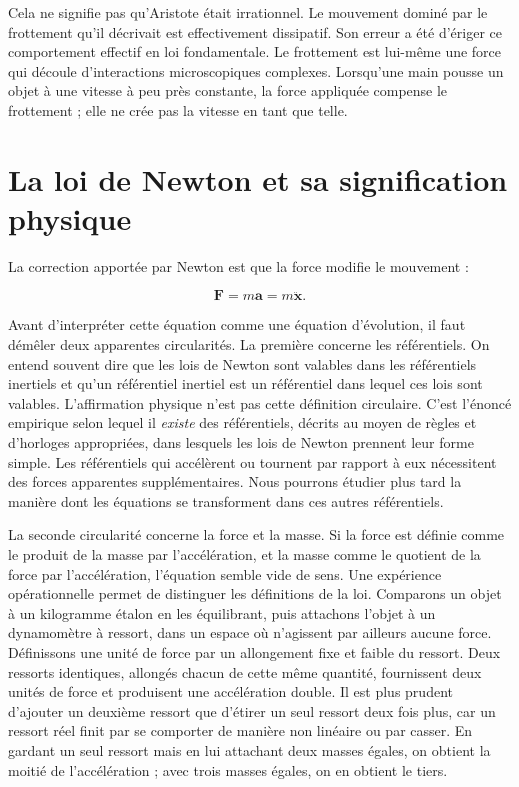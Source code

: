 Cela ne signifie pas qu’Aristote était irrationnel. Le mouvement dominé par le frottement qu’il décrivait est effectivement dissipatif. Son erreur a été d’ériger ce comportement effectif en loi fondamentale. Le frottement est lui-même une force qui découle d’interactions microscopiques complexes. Lorsqu’une main pousse un objet à une vitesse à peu près constante, la force appliquée compense le frottement ; elle ne crée pas la vitesse en tant que telle.

\section{La loi de Newton et sa signification physique}

La correction apportée par Newton est que la force modifie le mouvement :

\begin{equation}
  \mathbf F=m\mathbf a=m\ddot{\mathbf x}.
  \label{eq:newton-second-law}
\end{equation}

Avant d’interpréter cette équation comme une équation d’évolution, il faut démêler deux apparentes circularités. La première concerne les référentiels. On entend souvent dire que les lois de Newton sont valables dans les référentiels inertiels et qu’un référentiel inertiel est un référentiel dans lequel ces lois sont valables. L’affirmation physique n’est pas cette définition circulaire. C’est l’énoncé empirique selon lequel il \emph{existe} des référentiels, décrits au moyen de règles et d’horloges appropriées, dans lesquels les lois de Newton prennent leur forme simple. Les référentiels qui accélèrent ou tournent par rapport à eux nécessitent des forces apparentes supplémentaires. Nous pourrons étudier plus tard la manière dont les équations se transforment dans ces autres référentiels.

La seconde circularité concerne la force et la masse. Si la force est définie comme le produit de la masse par l’accélération, et la masse comme le quotient de la force par l’accélération, l’équation semble vide de sens. Une expérience opérationnelle permet de distinguer les définitions de la loi. Comparons un objet à un kilogramme étalon en les équilibrant, puis attachons l’objet à un dynamomètre à ressort, dans un espace où n’agissent par ailleurs aucune force. Définissons une unité de force par un allongement fixe et faible du ressort. Deux ressorts identiques, allongés chacun de cette même quantité, fournissent deux unités de force et produisent une accélération double. Il est plus prudent d’ajouter un deuxième ressort que d’étirer un seul ressort deux fois plus, car un ressort réel finit par se comporter de manière non linéaire ou par casser. En gardant un seul ressort mais en lui attachant deux masses égales, on obtient la moitié de l’accélération ; avec trois masses égales, on en obtient le tiers.

